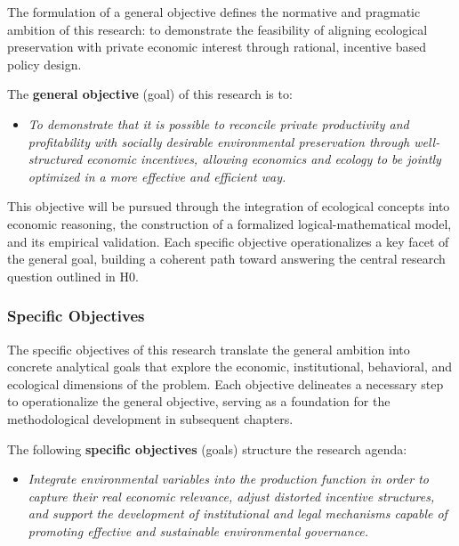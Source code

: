 The formulation of a general objective defines the normative and pragmatic ambition of this research: to demonstrate the feasibility of aligning ecological preservation with private economic interest through rational, incentive based policy design.

\vspace{1em}

The \textbf{general objective} (goal) of this research is to:

\begin{itemize}

    \item[\textbf{G0.}]
    
    \textit{To demonstrate that it is possible to reconcile private productivity and profitability with socially desirable environmental preservation through well-structured economic incentives, allowing economics and ecology to be jointly optimized in a more effective and efficient way.}
    
\end{itemize}

This objective will be pursued through the integration of ecological concepts into economic reasoning, the construction of a formalized logical-mathematical model, and its empirical validation. Each specific objective operationalizes a key facet of the general goal, building a coherent path toward answering the central research question outlined in H0.

\subsubsection{Specific Objectives}

The specific objectives of this research translate the general ambition into concrete analytical goals that explore the economic, institutional, behavioral, and ecological dimensions of the problem. Each objective delineates a necessary step to operationalize the general objective, serving as a foundation for the methodological development in subsequent chapters.

\vspace{1em}

The following \textbf{specific objectives} (goals) structure the research agenda:

\begin{itemize}

    \item[\textbf{G1.}]
    
    \textit{Integrate environmental variables into the production function in order to capture their real economic relevance, adjust distorted incentive structures, and support the development of institutional and legal mechanisms capable of promoting effective and sustainable environmental governance.}
    
\end{itemize}

